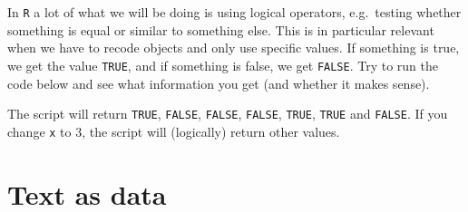 \documentclass[12pt,oneside]{reedthesis}
\theoremstyle{definition}
\theoremstyle{definition}
\theoremstyle{definition}
\theoremstyle{remark}
\begin{document}
  In \texttt{R} a lot of what we will be doing is using logical operators,
  e.g.~testing whether something is equal or similar to something else.
  This is in particular relevant when we have to recode objects and only
  use specific values. If something is true, we get the value
  \texttt{TRUE}, and if something is false, we get \texttt{FALSE}. Try to
  run the code below and see what information you get (and whether it
  makes sense).
  \begin{Shaded}
  \begin{Highlighting}[]
  \StringTok{ }
  
  \OperatorTok{==}\StringTok{ }        
  \OperatorTok{==}\StringTok{ }        
  \OperatorTok{!=}\StringTok{ }        
  \OperatorTok{<}\StringTok{ }         
  \OperatorTok{>}\StringTok{ }         
  \OperatorTok{<=}\StringTok{ }        
  \OperatorTok{>=}\StringTok{ }     
  \end{Highlighting}
  \end{Shaded}
  The script will return \texttt{TRUE}, \texttt{FALSE}, \texttt{FALSE},
  \texttt{FALSE}, \texttt{TRUE}, \texttt{TRUE} and \texttt{FALSE}. If you
  change \texttt{x} to 3, the script will (logically) return other values.
  
  \section{Text as data}\label{text-as-data}
  
\end{document}

